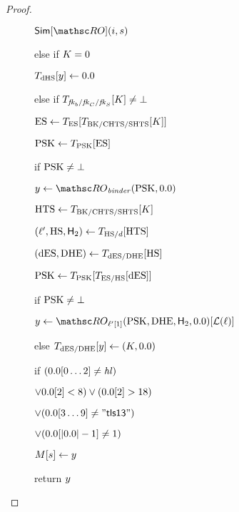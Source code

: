 \begin{proof}
\begin{figure}[tp]
\begin{minipage}[t]{0.45\textwidth}
\begin{oracle}{$\Sim[\RO](\simIndex,\simInString)$}
				\item else if $K = 0$ 
				\item \quad $\rlookuptable_{\dhs}[\simOut] \gets \hmactext$ 
				
				\item else if $T_{\mathit{fk}_b/\mathit{fk}_C/\mathit{fk}_S}[K]\neq \bot$
				
				\item \quad $\mathrm{ES} \gets T_{\mathrm{ES}}[T_{\mathrm{BK}/\mathrm{CHTS}/\mathrm{SHTS}}[K]]$
				\item \quad $\mathrm{PSK} \gets T_{\mathrm{PSK}}[\mathrm{ES}]$
				\item \quad if $\mathrm{PSK} \neq \bot$ 
				\item \quad \quad $\simOut \gets \RObinder(\psk, \hmactext)$
				
				\item \quad \quad $\mathrm{HTS} \gets T_{\mathrm{BK}/\mathrm{CHTS}/\mathrm{SHTS}}[K]$
				\item \quad $(\ell', \mathrm{HS}, \mathsf{H}_2) \gets T_{\mathrm{HS}/d}[\mathrm{HTS}]$
				\item \quad $(\mathrm{dES}, \mathrm{DHE}) \gets T_{\mathrm{dES}/\mathrm{DHE}}[\mathrm{HS}]$
				\item \quad $\mathrm{PSK} \gets T_{\mathrm{PSK}}[T_{\mathrm{ES}/\mathrm{HS}}[ \mathrm{dES}]]$
				\item \quad if $\mathrm{PSK} \neq \bot$ 
				\item \quad \quad $y \gets \RO_{\kdflbl'[1]}(\psk, \dhe,\hash_2, \hmactext)[	\lblT(\kdflbl)]$
				
				\item else $\rlookuptable_{\des/\dhe}[\simOut] \gets(\hmackey, \hmactext)$
				
				\item if $(\hmactext[0\ldots2] \neq \hashlen)$
				\item[]\quad$\vee\hmactext[2] < 8) \vee(\hmactext[2] > 18)$
				\item[] \quad $\vee(\hmactext[3\ldots9] \neq \mathsf{"tls13 "})$
				\item[]\quad$\vee (\hmactext[|\hmactext|-1] \neq  1)$ 
				\item[] \quad {}
				
				\item \qquad $M[s] \gets y$
				\item \qquad return $y$
				

\end{oracle}
\end{minipage}
\end{figure}
\end{proof}
